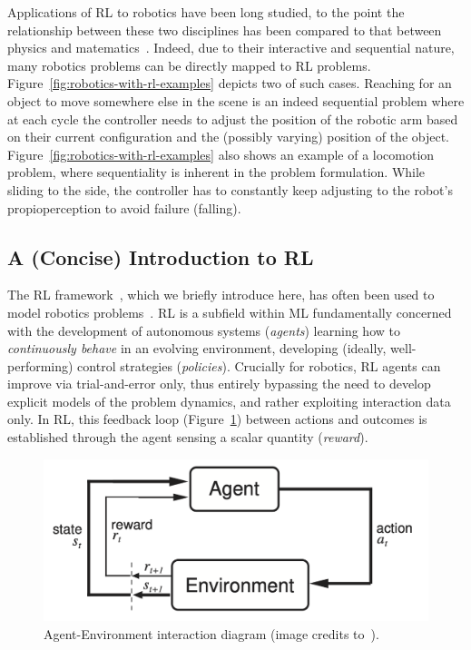 Applications of RL to robotics have been long studied, to the point the relationship between these two disciplines has been compared to that between physics and matematics~\citep{koberReinforcementLearningRobotics}.
Indeed, due to their interactive and sequential nature, many robotics problems can be directly mapped to RL problems.
Figure~\ref{fig:robotics-with-rl-examples} depicts two of such cases. 
Reaching for an object to move somewhere else in the scene is an indeed sequential problem where at each cycle the controller needs to adjust the position of the robotic arm based on their current configuration and the (possibly varying) position of the object.
Figure~\ref{fig:robotics-with-rl-examples} also shows an example of a locomotion problem, where sequentiality is inherent in the problem formulation. 
While sliding to the side, the controller has to constantly keep adjusting to the robot's propioperception to avoid failure (falling).

\subsection{A (Concise) Introduction to RL}
The RL framework~\citep{suttonReinforcementLearningIntroduction2018}, which we briefly introduce here, has often been used to model robotics problems~\citep{koberReinforcementLearningRobotics}.
RL is a subfield within ML fundamentally concerned with the development of autonomous systems (\emph{agents}) learning how to \emph{continuously behave} in an evolving environment, developing (ideally, well-performing) control strategies (\emph{policies}).
Crucially for robotics, RL agents can improve via trial-and-error only, thus entirely bypassing the need to develop explicit models of the problem dynamics, and rather exploiting interaction data only.
In RL, this feedback loop (Figure~\ref{fig:rl-most-famous-pic}) between actions and outcomes is established through the agent sensing a scalar quantity (\emph{reward}).

\begin{figure}
    \centering
    \includegraphics[width=0.5\linewidth]{figures/ch3/ch3-agent-env.png}
    \caption{Agent-Environment interaction diagram (image credits to~\citet{suttonReinforcementLearningIntroduction2018}).}
    \label{fig:rl-most-famous-pic}
\end{figure}

